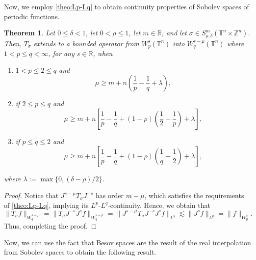 \documentclass[12pt, reqno]{amsart}
\newtheorem{theorem}{Theorem}[section]
\theoremstyle{definition}
\theoremstyle{remark}
\numberwithin{equation}{section}
\begin{document}
Now, we employ \cref{theo:Lp-Lq} to obtain continuity properties of Sobolev spaces of periodic functions.
\begin{theorem}
    Let $0\leq\delta<1$, let $0<\rho\leq 1$, let $m\in\mathbb{R}$, and let $\sigma\in S^m_{\rho,\delta}(\mathbb{T}^n\times\mathbb{Z}^n)$. Then, $T_\sigma$ extends to a bounded operator from $W^{s}_p(\mathbb{T}^n)$ into $W^{s-\mu}_q (\mathbb{T}^n)$ where $1<p\leq q<\infty$, for any $s\in\mathbb{R}$, when 
    \begin{enumerate}
        \item $1<p\leq 2 \leq q$ and 
        \begin{equation*}
            \mu \geq m + n \left( \frac{1}{p} - \frac{1}{q} + \lambda
            \right),
        \end{equation*}
        \item if $2 \leq p \leq q$ and 
        \begin{equation*}
            \mu \geq m + n \left[ \frac{1}{p} - \frac{1}{q} + (1-\rho) \left( \frac{1}{2} - \frac{1}{p}
            \right)
            + \lambda
            \right],
        \end{equation*}
        \item if $p\leq q \leq 2$ and 
        \begin{equation*}
            \mu \geq m + n \left[ \frac{1}{p} - \frac{1}{q} + (1-\rho) \left( \frac{1}{q} - \frac{1}{2}
            \right)
            + \lambda
            \right],
        \end{equation*}
    \end{enumerate}
     where $\lambda := \max\{ 0, (\delta-\rho)/2 \}$. 
\end{theorem}
\begin{proof}
    Notice that $J^{s-\mu}T_\sigma J^{-s}$ has order $m-\mu$, which satisfies the requirements of \cref{theo:Lp-Lq}, implying its $L^p$-$L^q$-continuity. Hence, we obtain that
    \begin{equation*}
        \|T_\sigma f\|_{W^{s-\mu}_q} = \|T_\sigma J^{-s}J^sf\|_{W^{s-\mu}_q} 
        = \|J^{s-\mu}T_\sigma J^{-s}J^sf\|_{L^q}
         \lesssim \|J^sf\|_{L^p} = \|f\|_{W^s_p}. 
    \end{equation*}
    Thus, completing the proof.
\end{proof}
Now, we can use the fact that Besov spaces are the result of the real interpolation from Sobolev spaces to obtain the following result. 
\end{document}
